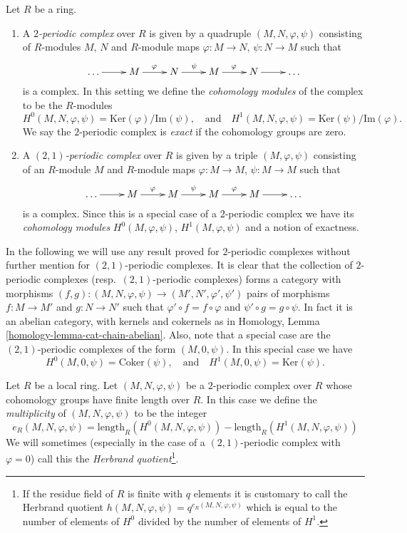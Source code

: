 \begin{definition}
\label{definition-periodic-complex}
Let $R$ be a ring.
\begin{enumerate}
\item A {\it $2$-periodic complex} over $R$ is given
by a quadruple $(M, N, \varphi, \psi)$ consisting of
$R$-modules $M$, $N$ and $R$-module maps $\varphi : M \to N$,
$\psi: N \to M$ such that
$$
\xymatrix{
\ldots \ar[r] &
M \ar[r]^\varphi &
N \ar[r]^\psi &
M \ar[r]^\varphi &
N \ar[r] & \ldots
}
$$
is a complex. In this setting we define the {\it cohomology modules}
of the complex to be the $R$-modules
$$
H^0(M, N, \varphi, \psi) = \text{Ker}(\varphi)/\text{Im}(\psi)
,\quad\text{and}\quad
H^1(M, N, \varphi, \psi) = \text{Ker}(\psi)/\text{Im}(\varphi).
$$
We say the $2$-periodic complex is {\it exact} if the cohomology
groups are zero.
\item A {\it $(2, 1)$-periodic complex} over $R$ is given
by a triple $(M, \varphi, \psi)$ consisting of an $R$-module $M$ and
$R$-module maps $\varphi : M \to M$, $\psi : M \to M$
such that
$$
\xymatrix{
\ldots \ar[r] &
M \ar[r]^\varphi &
M \ar[r]^\psi &
M \ar[r]^\varphi &
M \ar[r] & \ldots
}
$$
is a complex. Since this is a special case of a $2$-periodic complex
we have its {\it cohomology modules} $H^0(M, \varphi, \psi)$,
$H^1(M, \varphi, \psi)$ and a notion of exactness.
\end{enumerate}
\end{definition}

\noindent
In the following we will use any result proved for $2$-periodic
complexes without further mention for $(2, 1)$-periodic complexes.
It is clear that the collection of $2$-periodic complexes
(resp.\ $(2, 1)$-periodic complexes) forms a category with morphisms
$(f, g) : (M, N, \varphi, \psi) \to (M', N', \varphi', \psi')$
pairs of morphisms $f : M \to M'$ and $g : N \to N'$ such
that $\varphi' \circ f = f \circ \varphi$ and $\psi' \circ g = g \circ \psi$.
In fact it is an abelian category, with kernels and cokernels as in
Homology, Lemma \ref{homology-lemma-cat-chain-abelian}.
Also, note that a special case are the
$(2, 1)$-periodic complexes of the form $(M, 0, \psi)$. In this
special case we have
$$
H^0(M, 0, \psi) = \text{Coker}(\psi)
,\quad\text{and}\quad
H^1(M, 0, \psi) = \text{Ker}(\psi).
$$

\begin{definition}
\label{definition-periodic-length}
Let $R$ be a local ring.
Let $(M, N, \varphi, \psi)$ be a $2$-periodic complex over $R$
whose cohomology groups have finite length over $R$.
In this case we define the {\it multiplicity} of $(M, N, \varphi, \psi)$
to be the integer
$$
e_R(M, N, \varphi, \psi) = 
\text{length}_R(H^0(M, N, \varphi, \psi))
-
\text{length}_R(H^1(M, N, \varphi, \psi))
$$
We will sometimes (especially in the case of a $(2, 1)$-periodic complex with
$\varphi = 0$) call this the {\it Herbrand quotient}\footnote{If the residue
field of $R$ is finite with $q$ elements
it is customary to call the Herbrand quotient
$h(M, N, \varphi, \psi) = q^{e_R(M, N, \varphi, \psi)}$ which is equal to
the number of elements of $H^0$ divided by the number of elements of
$H^1$.}.
\end{definition}


